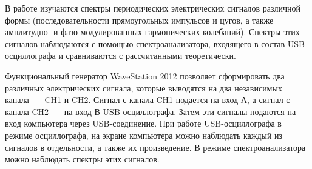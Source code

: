 


В работе изучаются спектры периодических электрических сигналов различной формы (последовательности прямоугольных импульсов и цугов, а также амплитудно- и фазо-модулированных гармонических колебаний). Спектры этих сигналов наблюдаются с помощью спектроанализатора, входящего в состав USB-осциллографа и сравниваются с рассчитанными теоретически.

\begin{figure}
\end{figure}

\experiment
Функциональный генератор WaveStation 2012 позволяет сформировать два различных электрических сигнала, которые выводятся на два независимых канала~--- CH1 и CH2. Сигнал с канала CH1 подается на вход А, а сигнал с канала CH2~--- на вход В USB-осциллографа. Затем эти сигналы подаются на вход компьютера через USB-соединение. При работе USB-осциллографа в режиме осциллографа, на экране компьютера можно наблюдать каждый из сигналов в отдельности, а также их произведение. В режиме спектроанализатора можно наблюдать спектры этих сигналов.

